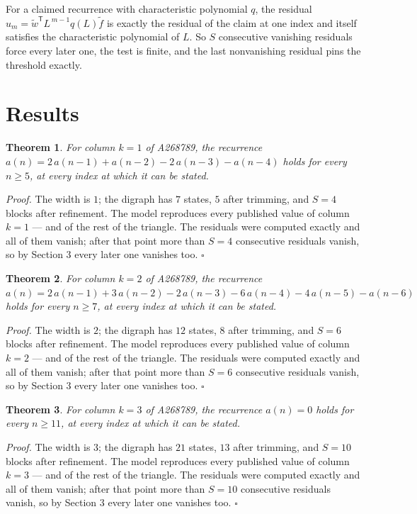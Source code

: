 \documentclass[11pt]{article}
\newtheorem{theorem}{Theorem}
\theoremstyle{definition}
\begin{document}
For a claimed recurrence with characteristic polynomial $q$, the residual $u_m = \tilde w^{\mathsf T}L^{\,m-1}q(L)\tilde f$ is exactly the residual of the claim at one index and itself satisfies the characteristic polynomial of $L$. So $S$ consecutive vanishing residuals force every later one, the test is finite, and the last nonvanishing residual pins the threshold exactly.

\section{Results}

\begin{theorem} For column $k = 1$ of A268789, the recurrence $a(n) = 2\,a(n-1) + a(n-2) - 2\,a(n-3) - a(n-4)$ holds for every $n \ge 5$, at every index at which it can be stated.\end{theorem}

{\itshape Proof.} The width is $1$; the digraph has $7$ states, $5$ after trimming, and $S = 4$ blocks after refinement. The model reproduces every published value of column $k = 1$ --- and of the rest of the triangle. The residuals were computed exactly and all of them vanish; after that point more than $S = 4$ consecutive residuals vanish, so by Section 3 every later one vanishes too. $\square$

\begin{theorem} For column $k = 2$ of A268789, the recurrence $a(n) = 2\,a(n-1) + 3\,a(n-2) - 2\,a(n-3) - 6\,a(n-4) - 4\,a(n-5) - a(n-6)$ holds for every $n \ge 7$, at every index at which it can be stated.\end{theorem}

{\itshape Proof.} The width is $2$; the digraph has $12$ states, $8$ after trimming, and $S = 6$ blocks after refinement. The model reproduces every published value of column $k = 2$ --- and of the rest of the triangle. The residuals were computed exactly and all of them vanish; after that point more than $S = 6$ consecutive residuals vanish, so by Section 3 every later one vanishes too. $\square$

\begin{theorem} For column $k = 3$ of A268789, the recurrence $a(n) = 0$ holds for every $n \ge 11$, at every index at which it can be stated.\end{theorem}

{\itshape Proof.} The width is $3$; the digraph has $21$ states, $13$ after trimming, and $S = 10$ blocks after refinement. The model reproduces every published value of column $k = 3$ --- and of the rest of the triangle. The residuals were computed exactly and all of them vanish; after that point more than $S = 10$ consecutive residuals vanish, so by Section 3 every later one vanishes too. $\square$
\end{document}
